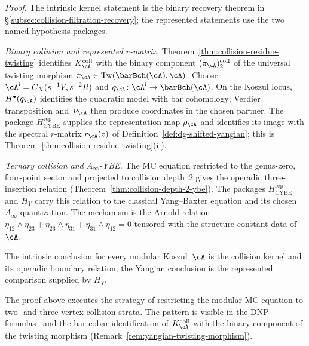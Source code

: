 \begin{proof}
The intrinsic kernel statement is the binary recovery theorem in
\S\ref{subsec:collision-filtration-recovery}; the represented
statements use the two named hypothesis packages.

\smallskip\noindent
\emph{Binary collision and represented $r$-matrix.}\;
Theorem~\ref{thm:collision-residue-twisting} identifies
$K_\cA^{\mathrm{coll}}$ with the binary component
$(\pi_\cA)_2^{\mathrm{coll}}$ of the universal twisting morphism
$\pi_\cA\in\mathrm{Tw}(\barBch(\cA),\cA)$.
Choose $\cA^{\mathrm i}=C_X(s^{-1}V,s^{-2}R)$ and
$q_\cA\colon\cA^{\mathrm i}\to\barBch(\cA)$.
On the Koszul locus, $H^\bullet(q_\cA)$ identifies the quadratic model
with bar cohomology; Verdier transposition and~$\nu_\cA$ then produce
coordinates in the chosen partner.  The package
$H_{\mathrm{CYBE}}^{\mathrm{rep}}$ supplies the representation map
$\rho_\cA$ and identifies its image with the spectral
$r$-matrix $r_\cA(z)$ of
Definition~\ref{def:dg-shifted-yangian}; this is
Theorem~\ref{thm:collision-residue-twisting}(ii).

\smallskip\noindent
\emph{Ternary collision and $A_\infty$-YBE.}\;
The MC equation restricted to the genus-zero, four-point sector and
projected to collision depth~$2$ gives the operadic three-insertion
relation \textup{(}Theorem~\ref{thm:collision-depth-2-ybe}\textup{)}.
The packages $H_{\mathrm{CYBE}}^{\mathrm{rep}}$ and $H_Y$ carry this
relation to the classical Yang--Baxter equation and its chosen
$A_\infty$ quantization.
The mechanism is the Arnold relation
$\eta_{12}\wedge\eta_{23} + \eta_{23}\wedge\eta_{31}
+ \eta_{31}\wedge\eta_{12} = 0$ tensored with the
structure-constant data of~$\cA$.

The intrinsic conclusion for every modular Koszul~$\cA$ is the
collision kernel and its operadic boundary relation; the Yangian
conclusion is the represented comparison supplied by $H_Y$.
\end{proof}

\begin{remark}
\label{rem:yangian-shadow-strategy}
The proof above executes the strategy of restricting the modular MC
equation to two- and three-vertex collision strata. The pattern is
visible in the DNP formulas~\cite{DNP25} and the bar-cobar
identification of $K_\cA^{\mathrm{coll}}$ with the binary component of
the twisting morphism
(Remark~\ref{rem:yangian-twisting-morphism}).\end{remark}

